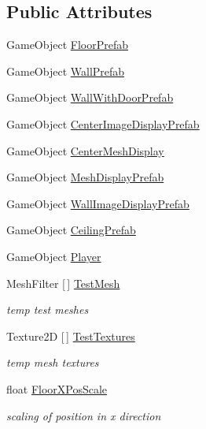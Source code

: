 \subsection*{Public Attributes}
\begin{DoxyCompactItemize}
\item 
Game\+Object \mbox{\hyperlink{class_museum_builder_a357c5b16bf4a1b1a10eacfec75bf2869}{Floor\+Prefab}}
\item 
Game\+Object \mbox{\hyperlink{class_museum_builder_adede3b195361b0b02def8c0c26ccb5d0}{Wall\+Prefab}}
\item 
Game\+Object \mbox{\hyperlink{class_museum_builder_a9494f3d21dd268b7d542ece9901e6b7c}{Wall\+With\+Door\+Prefab}}
\item 
Game\+Object \mbox{\hyperlink{class_museum_builder_a1a8a4b93806cc0edfc74a9b94750e96c}{Center\+Image\+Display\+Prefab}}
\item 
Game\+Object \mbox{\hyperlink{class_museum_builder_acb0c15557dd0d3151d42e7b28b57ee31}{Center\+Mesh\+Display}}
\item 
Game\+Object \mbox{\hyperlink{class_museum_builder_adc42d6478ee13f86e50fd0be210d9a4e}{Mesh\+Display\+Prefab}}
\item 
Game\+Object \mbox{\hyperlink{class_museum_builder_ad898a0067b63d2386284e0130849bf9a}{Wall\+Image\+Display\+Prefab}}
\item 
Game\+Object \mbox{\hyperlink{class_museum_builder_a9966f9ce8cc1117cb72e3aa42ea1a490}{Ceiling\+Prefab}}
\item 
Game\+Object \mbox{\hyperlink{class_museum_builder_a57f709574a50b97bb8f44f0d53606c44}{Player}}
\item 
Mesh\+Filter \mbox{[}$\,$\mbox{]} \mbox{\hyperlink{class_museum_builder_aac70b019fbefe1d65a4853448eed0609}{Test\+Mesh}}
\begin{DoxyCompactList}\small\item\em temp test meshes \end{DoxyCompactList}\item 
Texture2D \mbox{[}$\,$\mbox{]} \mbox{\hyperlink{class_museum_builder_a002d66342d0fc72765e89a6f78bd312f}{Test\+Textures}}
\begin{DoxyCompactList}\small\item\em temp mesh textures \end{DoxyCompactList}\item 
float \mbox{\hyperlink{class_museum_builder_a754d766babff00a827e99b8bc51ff716}{Floor\+X\+Pos\+Scale}}
\begin{DoxyCompactList}\small\item\em scaling of position in x direction \end{DoxyCompactList}\item 

\end{DoxyCompactItemize}
